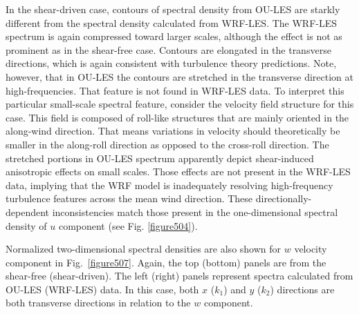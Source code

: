 In the shear-driven case, contours of spectral density from OU-LES are starkly different from the spectral density calculated from WRF-LES. The WRF-LES spectrum is again compressed toward larger scales, although the effect is not as prominent as in the shear-free case. Contours are elongated in the transverse directions, which is again consistent with turbulence theory predictions. Note, however, that in OU-LES the contours are stretched in the transverse direction at high-frequencies. That feature is not found in WRF-LES data. To interpret this particular small-scale spectral feature, consider the velocity field structure for this case. This field is composed of roll-like structures that are mainly oriented in the along-wind direction. That means variations in velocity should theoretically be smaller in the along-roll direction as opposed to the cross-roll direction. The stretched portions in OU-LES spectrum apparently depict shear-induced anisotropic effects on small scales. Those effects are not present in the WRF-LES data, implying that the WRF model is inadequately resolving high-frequency turbulence features across the mean wind direction. These directionally-dependent inconsistencies match those present in the one-dimensional spectral density of $u$ component (see Fig. \autoref{figure504}).

Normalized two-dimensional spectral densities are also shown for $w$ velocity component in Fig.~\ref{figure507}. Again, the top (bottom) panels are from the shear-free (shear-driven). The left (right) panels represent spectra calculated from OU-LES (WRF-LES) data. In this case, both $x$ ($k_1$) and $y$ ($k_2$) directions are both transverse directions in relation to the $w$ component. 


